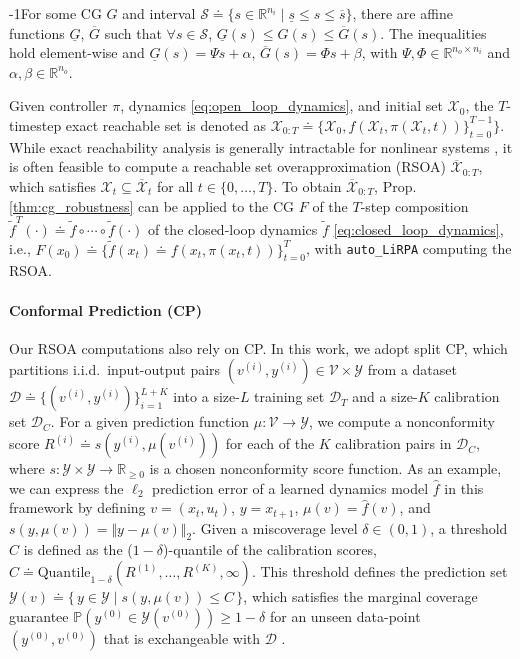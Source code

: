 \begin{proposition}
\label{thm:cg_robustness}
\looseness-1For some CG $G$ and interval $\mathcal{S} \doteq \{s \in \mathbb{R}^{n_i} \mid \underline{s} \le s \le \overline{s}\}$, there are affine functions $\underline{G}$, $\overline{G}$ such that $\forall s \in \mathcal{S}$, $\underline{G}(s) \leq G(s) \leq \overline{G}(s)$. 
The inequalities hold element-wise and $\underline{G}(s) = \Psi s + \alpha$,  $\overline{G}(s) = \Phi s + \beta$, with $\Psi, \Phi \in \mathbb{R}^{n_o \times n_i}$ and $\alpha, \beta \in \mathbb{R}^{n_o}$.
\end{proposition}

\noindent Given controller $\pi$, dynamics \eqref{eq:open_loop_dynamics}, and initial set $\mathcal{X}_0$, the $T$-timestep exact reachable set is denoted as $\mathcal{X}_{0:T} \doteq \{\mathcal{X}_0, f(\mathcal{X}_t, \pi(\mathcal{X}_t,t)) \}_{t=0}^{T-1}\}$. While exact reachability analysis is generally intractable for nonlinear systems \citep{DBLP:journals/arcras/AlthoffFG21}, it is often feasible to compute a reachable set overapproximation (RSOA) $\overline{\mathcal{X}}_{0:T}$, which satisfies $\mathcal{X}_t \subseteq \overline{\mathcal{X}}_t$ for all $t \in \{0,\ldots,T\}$. To obtain $\overline{\mathcal{X}}_{0:T}$, Prop. \ref{thm:cg_robustness} can be applied to the CG $F$ of the $T$-step composition ${\tilde f^{T}}(\cdot) \doteq \tilde{f} \circ \dotsb \circ \tilde{f}(\cdot)$ of the closed-loop dynamics $\tilde f$ \eqref{eq:closed_loop_dynamics}, i.e., $F(x_0) \doteq \{\tilde f(x_t) \doteq f(x_t, \pi(x_t, t)) \}_{t=0}^{T}$, with \texttt{auto\_LiRPA} computing the RSOA.

\paragraph{Conformal Prediction (CP)}
Our RSOA computations also rely on CP. In this work, we adopt split CP, which partitions i.i.d.\ input-output pairs $(v^{(i)}, y^{(i)}) \in \mathcal{V}\times\mathcal{Y}$ from a dataset $\mathcal{D} \doteq\{(v^{(i)}, y^{(i)})\}_{i=1}^{L+K}$ into a size-$L$ training set $\mathcal{D}_T$ and a size-$K$ calibration set $\mathcal{D}_C$. For a given prediction function $\mu:\mathcal{V}\!\to\!\mathcal{Y}$, we compute a nonconformity score $R^{(i)}\!\doteq s(y^{(i)},\mu(v^{(i)}))$ for each of the $K$ calibration pairs in $\mathcal{D}_C$, where $s: \mathcal{Y}\times \mathcal{Y} \rightarrow \mathbb{R}_{\ge 0}$ is a chosen nonconformity score function. As an example, we can express the $\ell_2$ prediction error of a learned dynamics model $\hat f$ in this framework by defining $v = (x_t, u_t)$, $y = x_{t+1}$, $\mu(v) = \hat f(v)$, and $s(y, \mu(v)) = \Vert y - \mu(v)\Vert_2$. Given a miscoverage level $\delta\in(0,1)$, a threshold $C$ is defined as the ($1-\delta$)-quantile of the calibration scores, $C \doteq \text{Quantile}_{1-\delta}(R^{(1)},\dots,R^{(K)},\infty)$. This threshold defines the prediction set $\mathcal{Y}(v) \doteq \{\,y\in\mathcal{Y} \mid s(y,\mu(v))\le C \,\}$, which satisfies the marginal coverage guarantee $\mathbb{P}(y^{(0)}\in\mathcal{Y}(v^{(0)})) \ge 1-\delta$ for an unseen data-point $(y^{(0)}, v^{(0)})$ that is exchangeable with $\mathcal{D}$ \citep{cp_survey}. 
